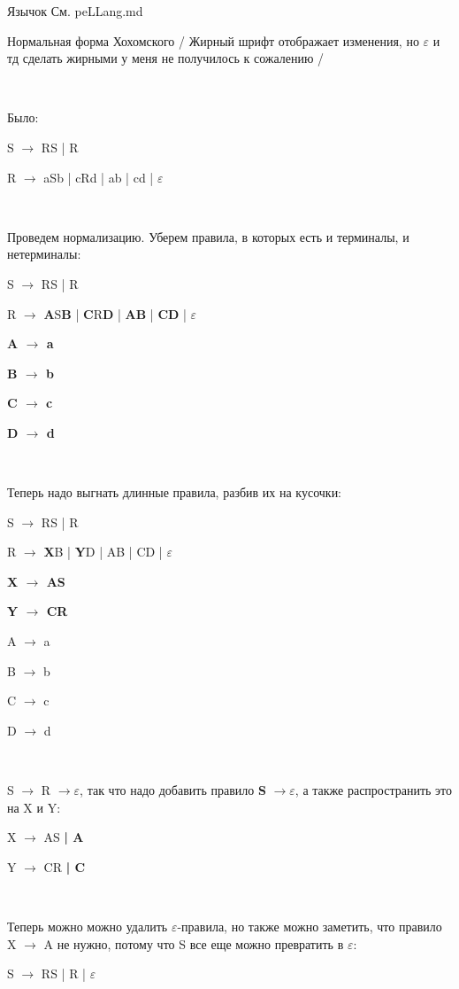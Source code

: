 \documentclass[12pt]{article}
\begin{document}
\begin{section}{Язычок}
    См. peLLang.md
\end{section}

\begin{section}{Нормальная форма Хохомского}
    / Жирный шрифт отображает изменения, но $\varepsilon$ и тд сделать жирными у меня не получилось к сожалению /

\

    Было:

    S $\to$ RS | R
    
    R $\to$ aSb | cRd | ab | cd | $\varepsilon$

    \

    Проведем нормализацию.
    Уберем правила, в которых есть и терминалы, и нетерминалы:

    S $\to$ RS | R
    
    R $\to$ \textbf{A}S\textbf{B} | \textbf{C}R\textbf{D} | \textbf{AB} | \textbf{CD} | $\varepsilon$

    \textbf{A $\to$ a}

    \textbf{B $\to$ b}

    \textbf{C $\to$ c}

    \textbf{D $\to$ d}


\

    Теперь надо выгнать длинные правила, разбив их на кусочки:

    S $\to$ RS | R
    
    R $\to$ \textbf{X}B | \textbf{Y}D | AB | CD | $\varepsilon$

    \textbf{X $\to$ AS}

    \textbf{Y $\to$ CR}

    A $\to$ a

    B $\to$ b

    C $\to$ c

    D $\to$ d

\

    S $\to$ R $\to \varepsilon$, так что надо добавить правило \textbf{S} $\to \varepsilon$, а также распространить это на X и Y:

    X $\to$ AS \textbf{| A}
    
    Y $\to$ CR \textbf{| C}

\

    Теперь можно можно удалить $\varepsilon$-правила, но также можно заметить, что правило X $\to$ A не нужно, потому что S
    все еще можно превратить в $\varepsilon$:


    S $\to$ RS | R | $\varepsilon$
    

\end{section}
\end{document}
